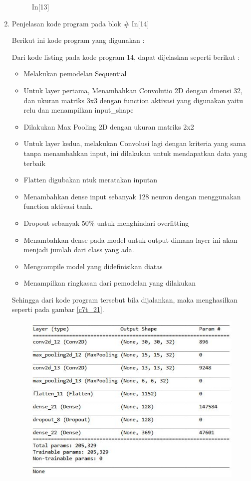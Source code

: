 \begin{enumerate}
\begin{figure}[!htbp]
\caption{In[13]}
\label{c7t_20}
\end{figure}
\item Penjelasan kode program pada blok \# In[14]
\par Berikut ini kode program yang digunakan :

\par Dari kode listing pada kode program 14, dapat dijelaskan seperti berikut :
\begin{itemize}
\item Melakukan pemodelan Sequential
\item Untuk layer pertama, Menambahkan Convolutio 2D dengan dmensi 32, dan ukuran matriks 3x3 dengan function aktivasi yang digunakan yaitu relu dan menampilkan input\_shape
\item Dilakukan Max Pooling 2D dengan ukuran matriks 2x2
\item Untuk layer kedua, melakukan Convolusi lagi dengan kriteria yang sama tanpa menambahkan input, ini dilakukan untuk mendapatkan data yang terbaik
\item Flatten digubakan ntuk meratakan inputan
\item Menambahkan dense input sebanyak 128 neuron dengan menggunakan function aktivasi tanh.
\item Dropout sebanyak 50\% untuk menghindari overfitting
\item Menambahkan dense pada model untuk output dimana layer ini akan menjadi jumlah dari class yang ada.
\item Mengcompile model yang didefinisikan diatas
\item Menampilkan ringkasan dari pemodelan yang dilakukan
\end{itemize}
\par Sehingga dari kode program tersebut bila dijalankan, maka menghasilkan seperti pada gambar \ref{c7t_21}.
\begin{figure}[!htbp]
\centerline{\includegraphics[width=1\textwidth]{figures/c7t/21.JPG}}

\end{figure}
\end{enumerate}
